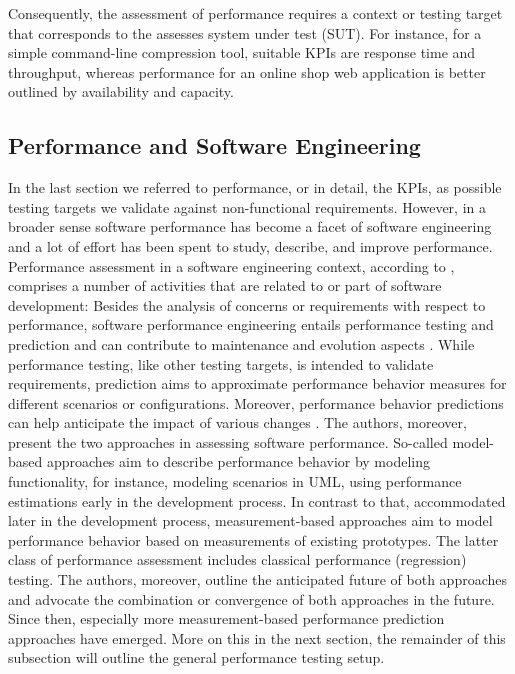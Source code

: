 Consequently, the assessment of performance requires a context or testing
target that corresponds to the assesses system under test (SUT). For instance,
for a simple command-line compression tool, suitable KPIs are response time and
throughput, whereas performance for an online shop web application is better
outlined by availability and capacity.

\subsection{Performance and Software Engineering}
In the last section we referred to performance, or in detail, the KPIs, as
possible testing targets we validate against non-functional requirements.
However, in a broader sense software performance has become a facet of software
engineering and a lot of effort has been spent to study, describe, and improve
performance. Performance assessment in a software engineering context,
according to \cite{molyneaux_art_2014}, comprises a number of activities that
are related to or part of software development: Besides the analysis of concerns or
requirements with respect to performance, software performance engineering
entails performance testing and prediction and can contribute to maintenance
and evolution aspects \citep{woodside_future_2007}. While performance testing,
like other testing targets, is intended to validate requirements, prediction aims to
approximate performance behavior measures for different scenarios or
configurations. Moreover, performance behavior predictions can help anticipate
the impact of various changes \citep{woodside_future_2007}.
The authors, moreover, present the two approaches in assessing software
performance. So-called model-based approaches aim to describe performance
behavior by modeling functionality, for instance, modeling scenarios in UML,
using performance estimations early in the development process. In contrast to
that, accommodated later in the development process, measurement-based
approaches aim to model performance behavior based on measurements of existing
prototypes. The latter class of performance assessment includes classical
performance (regression) testing. The authors, moreover, outline the
anticipated future of both approaches and advocate the combination or
convergence of both approaches in the future. Since then, especially more
measurement-based performance prediction approaches have emerged. More on this
in the next section, the remainder of this subsection will outline the general
performance testing setup.

